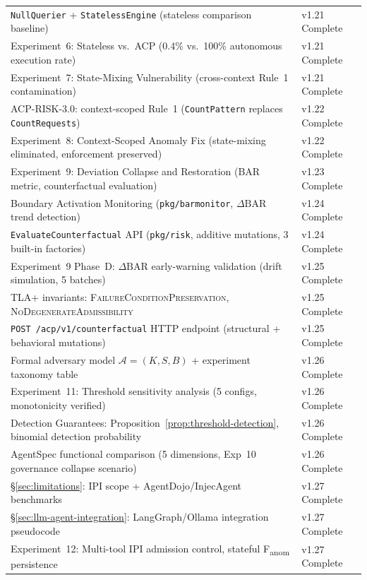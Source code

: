\documentclass[11pt]{article}
\theoremstyle{definition}
\begin{document}
\begin{table}[h!]
\begin{tabular}{@{}p{9.5cm}l@{}}
\texttt{NullQuerier} + \texttt{StatelessEngine} (stateless comparison baseline) & v1.21 Complete \\
Experiment~6: Stateless vs.\ ACP (0.4\% vs.\ 100\% autonomous execution rate) & v1.21 Complete \\
Experiment~7: State-Mixing Vulnerability (cross-context Rule~1 contamination) & v1.21 Complete \\
ACP-RISK-3.0: context-scoped Rule~1 (\texttt{CountPattern} replaces \texttt{CountRequests}) & v1.22 Complete \\
Experiment~8: Context-Scoped Anomaly Fix (state-mixing eliminated, enforcement preserved) & v1.22 Complete \\
Experiment~9: Deviation Collapse and Restoration (BAR metric, counterfactual evaluation) & v1.23 Complete \\
Boundary Activation Monitoring (\texttt{pkg/barmonitor}, $\Delta\mathrm{BAR}$ trend detection) & v1.24 Complete \\
\texttt{EvaluateCounterfactual} API (\texttt{pkg/risk}, additive mutations, 3 built-in factories) & v1.24 Complete \\
Experiment~9 Phase~D: $\Delta\mathrm{BAR}$ early-warning validation (drift simulation, 5 batches) & v1.25 Complete \\
TLA+ invariants: \textsc{FailureConditionPreservation}, \textsc{NoDegenerateAdmissibility} & v1.25 Complete \\
\texttt{POST /acp/v1/counterfactual} HTTP endpoint (structural + behavioral mutations) & v1.25 Complete \\
Formal adversary model $\mathcal{A}=(K,S,B)$ + experiment taxonomy table & v1.26 Complete \\
Experiment~11: Threshold sensitivity analysis (5 configs, monotonicity verified) & v1.26 Complete \\
Detection Guarantees: Proposition~\ref{prop:threshold-detection}, binomial detection probability & v1.26 Complete \\
AgentSpec functional comparison (5 dimensions, Exp~10 governance collapse scenario) & v1.26 Complete \\
\S\ref{sec:limitations}: IPI scope + AgentDojo/InjecAgent benchmarks & v1.27 Complete \\
\S\ref{sec:llm-agent-integration}: LangGraph/Ollama integration pseudocode & v1.27 Complete \\
Experiment~12: Multi-tool IPI admission control, stateful F\textsubscript{anom} persistence & v1.27 Complete \\

\end{tabular}
\end{table}
\end{document}
